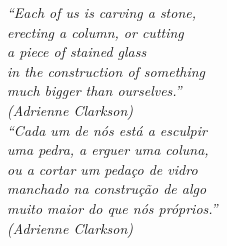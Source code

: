 
\begin{epigrafe}%
\textit{
``Each of us is carving a stone,\\
erecting a column, or cutting \\
a piece of stained glass \\
in the construction of something \\
much bigger than ourselves.'' \\
(Adrienne Clarkson) \\
}
\textit{
``Cada um de nós está a esculpir \\
uma pedra, a erguer uma coluna, \\
ou a cortar um pedaço de vidro \\
manchado na construção de algo \\
muito maior do que nós próprios.'' \\
(Adrienne Clarkson) \\
}
    
\end{epigrafe}
